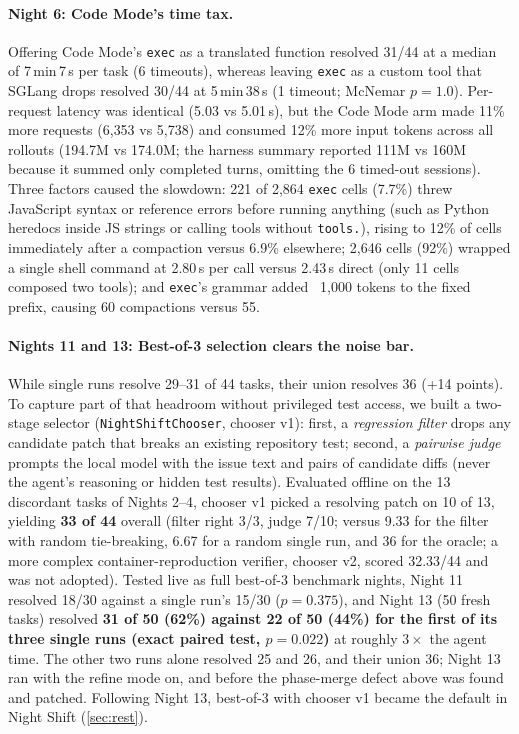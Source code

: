 \documentclass[11pt]{article}
\newcommand{\code}[1]{\texttt{#1}}
\begin{document}
\paragraph{Night 6: Code Mode's time tax.} Offering Code Mode's \code{exec} as a translated
function resolved 31/44 at a median of 7\,min\,7\,s per task (6 timeouts), whereas leaving
\code{exec} as a custom tool that SGLang drops resolved 30/44 at 5\,min\,38\,s (1 timeout; McNemar
$p = 1.0$). Per-request latency was identical (5.03 vs 5.01\,s), but the Code Mode arm made 11\%
more requests (6{,}353 vs 5{,}738) and consumed 12\% more input tokens across all rollouts (194.7M
vs 174.0M; the harness summary reported 111M vs 160M because it summed only completed turns,
omitting the 6 timed-out sessions). Three factors caused the slowdown: 221 of 2{,}864 \code{exec}
cells (7.7\%) threw JavaScript syntax or reference errors before running anything (such as Python
heredocs inside JS strings or calling tools without \code{tools.}), rising to 12\% of cells
immediately after a compaction versus 6.9\% elsewhere; 2{,}646 cells (92\%) wrapped a single shell
command at 2.80\,s per call versus 2.43\,s direct (only 11 cells composed two tools); and
\code{exec}'s grammar added ~1{,}000 tokens to the fixed prefix, causing 60 compactions versus 55.

\paragraph{Nights 11 and 13: Best-of-3 selection clears the noise bar.} While single runs resolve
29--31 of 44 tasks, their union resolves 36 (+14 points). To capture part of that headroom without
privileged test access, we built a two-stage selector (\code{NightShiftChooser}, chooser v1): first,
a \emph{regression filter} drops any candidate patch that breaks an existing repository test;
second, a \emph{pairwise judge} prompts the local model with the issue text and pairs of candidate
diffs (never the agent's reasoning or hidden test results). Evaluated offline on the 13 discordant
tasks of Nights 2--4, chooser v1 picked a resolving patch on 10 of 13, yielding \textbf{33 of 44} overall
(filter right 3/3, judge 7/10; versus 9.33 for the filter with random tie-breaking, 6.67 for a
random single run, and 36 for the oracle; a more complex container-reproduction verifier, chooser
v2, scored 32.33/44 and was not adopted). Tested live as full best-of-3 benchmark nights, Night 11
resolved 18/30 against a single run's 15/30 ($p = 0.375$), and Night 13 (50 fresh tasks) resolved
\textbf{31 of 50 (62\%) against 22 of 50 (44\%) for the first of its three single runs (exact
paired test, $p = 0.022$)} at roughly $3\times$ the agent time. The other two runs alone resolved
25 and 26, and their union 36; Night 13 ran with the refine mode on, and before the phase-merge
defect above was found and patched. Following Night 13, best-of-3 with chooser v1 became the default
in Night Shift (\cref{sec:rest}).
\end{document}

